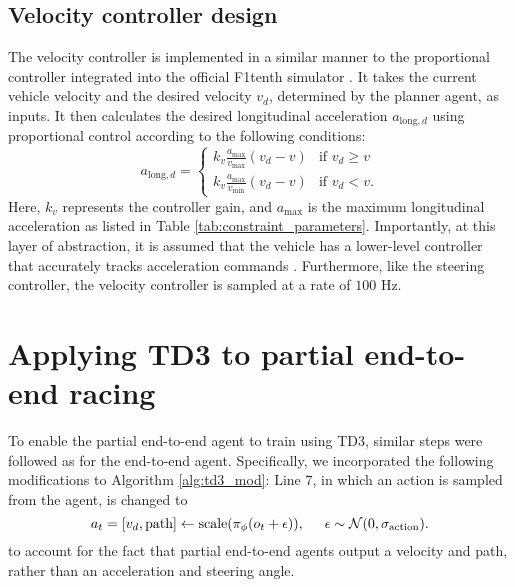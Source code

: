 
\subsection{Velocity controller design}

The velocity controller is implemented in a similar manner to the proportional controller integrated into the official F1tenth simulator \cite{f1tenth}.
It takes the current vehicle velocity and the desired velocity $v_d$, determined by the planner agent, as inputs. 
It then calculates the desired longitudinal acceleration $a_{\text{long},d}$ using proportional control according to the following conditions:
\begin{equation}
    a_{\text{long},d} = 
    \begin{cases}
        k_v \frac{a_{\text{max}}}{v_{\text{max}}}(v_d - v) & \text{if } v_d \geq v\\
        k_v \frac{a_{\text{max}}}{v_{\text{min}}}(v_d - v) & \text{if } v_d < v.
    \end{cases}
\label{eq:vel_control}
\end{equation}
Here, $k_v$ represents the controller gain, and $a_{\text{max}}$ is the maximum longitudinal acceleration as listed in Table \ref{tab:constraint_parameters}.
Importantly, at this layer of abstraction, it is assumed that the vehicle has a lower-level controller that accurately tracks acceleration commands \cite{Betz2021, Rajamani2012}.
Furthermore, like the steering controller, the velocity controller is sampled at a rate of $100$ Hz.








\section{Applying TD3 to partial end-to-end racing}\label{sec:TD3_pete}

To enable the partial end-to-end agent to train using TD3, similar steps were followed as for the end-to-end agent. 
Specifically, we incorporated the following modifications to Algorithm \ref{alg:td3_mod}:
Line $7$, in which an action is sampled from the agent, is changed to
\begin{equation}\label{eq:pete_agent_sample}
    a_{t} = [v_d, \text{path}] \leftarrow \text{scale}( \pi_{\phi}(o_t+\epsilon) ), \hspace{0.5cm} \epsilon \sim \mathcal{N}(0, \sigma_{\text{action}}).
\end{equation}
to account for the fact that partial end-to-end agents output a velocity and path, rather than an acceleration and steering angle.


